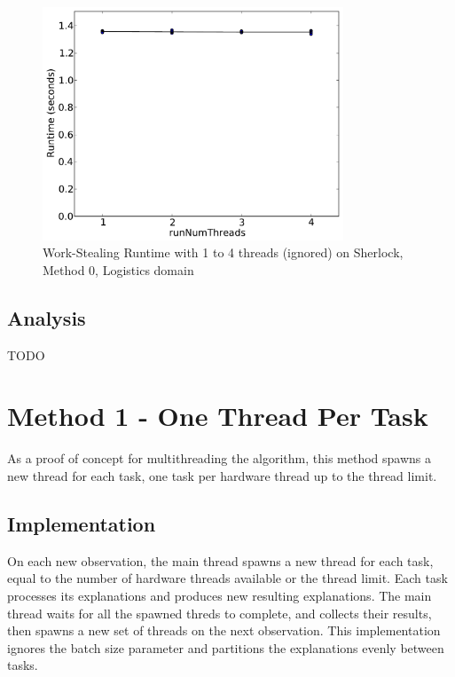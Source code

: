 \documentclass[12pt,twoside,abbrevs,msc,ai,notimes,logo,sansheadings]{infthesis}
\begin{document}
  \begin{figure}[!htbp]
  \begin{centering}
  \includegraphics[width=0.8\textwidth]{images/threads-log3-sherlock-0-1}
  \par\end{centering}
  \caption{Work-Stealing Runtime with 1 to 4 threads (ignored) on Sherlock, Method 0, Logistics domain}
  \end{figure}
  \section{Analysis}
  TODO
  
  \chapter {Method 1 - One Thread Per Task}
  
  As a proof of concept for multithreading the algorithm, this method spawns a new thread for each task, one task per hardware thread up to the thread limit.
  
  \section {Implementation}
  
  On each new observation,  the main thread spawns a new thread for each task, equal to the number of hardware threads available or the thread limit. Each task processes its explanations and produces new resulting explanations. The main thread waits for all the spawned threds to complete, and collects their results, then spawns a new set of threads on the next observation. This implementation ignores the batch size parameter and partitions the explanations evenly between tasks.
  
\end{document}
